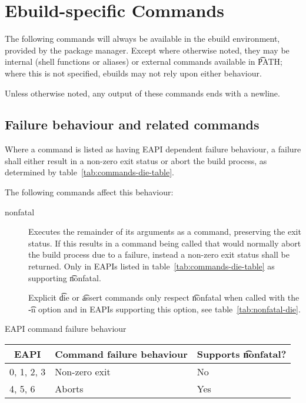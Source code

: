 \section{Ebuild-specific Commands}
\label{sec:pkg-mgr-commands}

The following commands will always be available in the ebuild environment, provided by the package
manager. Except where otherwise noted, they may be internal (shell functions or aliases) or external
commands available in \t{PATH}; where this is not specified, ebuilds may not rely upon either
behaviour.

Unless otherwise noted, any output of these commands ends with a newline.

\subsection{Failure behaviour and related commands}
\label{sec:failure-behaviour}

 Where a command is listed as having EAPI dependent failure behaviour,
a failure shall either result in a non-zero exit status or abort the build process, as determined by
table~\ref{tab:commands-die-table}.

The following commands affect this behaviour:
\begin{description}
\item[nonfatal]  Executes the remainder of its arguments as a command,
    preserving the exit status. If this results in a command being called that would normally abort
    the build process due to a failure, instead a non-zero exit status shall be returned. Only in
    EAPIs listed in table~\ref{tab:commands-die-table} as supporting \t{nonfatal}.

    Explicit \t{die} or \t{assert} commands only respect \t{nonfatal} when called with the \t{-n}
    option and in EAPIs supporting this option, see table~\ref{tab:nonfatal-die}.
\end{description}

\begin{centertable}{EAPI command failure behaviour}
    \label{tab:commands-die-table}
    \begin{tabular}{lll}
      \toprule
      \multicolumn{1}{c}{\textbf{EAPI}} &
      \multicolumn{1}{c}{\textbf{Command failure behaviour}} &
      \multicolumn{1}{c}{\textbf{Supports \t{nonfatal}?}} \\
      \midrule
      0, 1, 2, 3        & Non-zero exit & No  \\
      4, 5, 6           & Aborts        & Yes \\
      \bottomrule
    \end{tabular}
\end{centertable}

